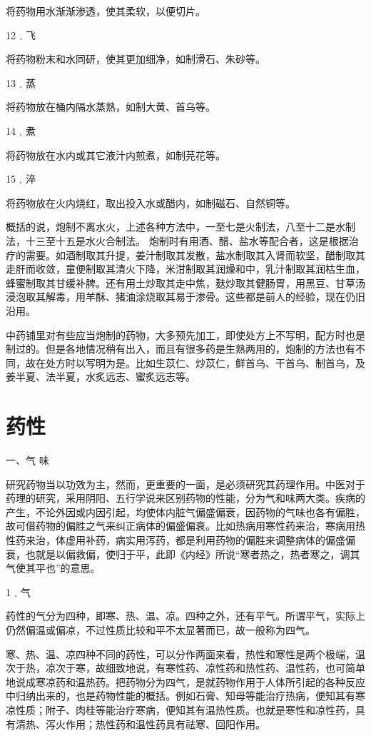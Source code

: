 \documentclass[a4paper,12pt,UTF8,twoside]{ctexbook}
\begin{document}
将药物用水渐渐渗透，使其柔软，以便切片。

12﹒飞

将药物粉末和水同研，使其更加细净，如制滑石、朱砂等。

13﹒蒸

将药物放在桶内隔水蒸熟，如制大黄、首乌等。

14﹒煮

将药物放在水内或其它液汁内煎煮，如制芫花等。

15﹒淬

将药物放在火内烧红，取出投入水或醋内，如制磁石、自然铜等。

概括的说，炮制不离水火，上述各种方法中，一至七是火制法，八至十二是水制法，十三至十五是水火合制法。
炮制时有用酒、醋、盐水等配合者，这是根据治疗的需要。如酒制取其升提，姜汁制取其发散，盐水制取其入肾而软坚，醋制取其走肝而收敛，童便制取其清火下降，米泔制取其润燥和中，乳汁制取其润枯生血，蜂蜜制取其甘缓补脾。还有用土炒取其走中焦，麸炒取其健肠胃，用黑豆、甘草汤浸泡取其解毒，用羊酥、猪油涂烧取其易于渗骨。这些都是前人的经验，现在仍旧沿用。

中药铺里对有些应当炮制的药物，大多预先加工，即使处方上不写明，配方时也是制过的。但是各地情况稍有出入，而且有很多药是生熟两用的，炮制的方法也有不同，故在处方时以写明为是。比如生苡仁、炒苡仁，鲜首乌、干首乌、制首乌，及姜半夏、法半夏，水炙远志、蜜炙远志等。

\section{药性}

一、气 味

研究药物当以功效为主，然而，更重要的一面，是必须研究其药理作用。中医对于药理的研究，采用阴阳、五行学说来区别药物的性能，分为气和味两大类。疾病的产生，不论外因或内因引起，均使体内脏气偏盛偏衰，因药物的气味也各有偏胜，故可借药物的偏胜之气来纠正病体的偏盛偏衰。比如热病用寒性药来治，寒病用热性药来治，体虚用补药，病实用泻药，都是利用药物的偏胜来调整病体的偏盛偏衰，也就是以偏救偏，使归于平，此即《内经》所说“寒者热之，热者寒之，调其气使其平也”的意思。

1﹒气

药性的气分为四种，即寒、热、温、凉。四种之外，还有平气。所谓平气，实际上仍然偏温或偏凉，不过性质比较和平不太显著而已，故一般称为四气。

寒、热、温、凉四种不同的药性，可以分作两面来看，热性和寒性是两个极端，温次于热，凉次于寒，故细致地说，有寒性药、凉性药和热性药、温性药，也可简单地说成寒凉药和温热药。把药物分为四气，是就药物作用于人体所引起的各种反应中归纳出来的，也是药物性能的概括。例如石膏、知母等能治疗热病，便知其有寒凉性质；附子、肉桂等能治疗寒病，便知其有温热性质。也就是寒性和凉性药，具有清热、泻火作用；热性药和温性药具有祛寒、回阳作用。
\end{document}
